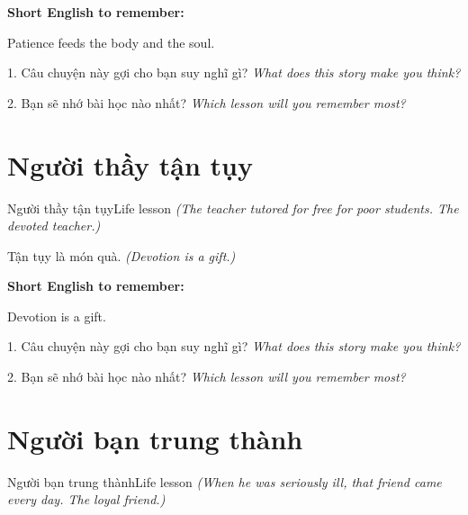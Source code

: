 \begin{ghinhoanh}
\textbf{Short English to remember:}

Patience feeds the body and the soul.

\end{ghinhoanh}

\begin{tuhocnhanh}
1. Câu chuyện này gợi cho bạn suy nghĩ gì? \textit{What does this story make you think?}

2. Bạn sẽ nhớ bài học nào nhất? \textit{Which lesson will you remember most?}
\end{tuhocnhanh}
\ngancach


\section{Người thầy tận tụy}
\begin{truyen}{Người thầy tận tụy}{Life lesson}
\textit{(The teacher tutored for free for poor students. The devoted teacher.)}
\end{truyen}

\begin{baihoc}
Tận tụy là món quà.
\textit{(Devotion is a gift.)}
\end{baihoc}

\begin{ghinhoanh}
\textbf{Short English to remember:}

Devotion is a gift.

\end{ghinhoanh}

\begin{tuhocnhanh}
1. Câu chuyện này gợi cho bạn suy nghĩ gì? \textit{What does this story make you think?}

2. Bạn sẽ nhớ bài học nào nhất? \textit{Which lesson will you remember most?}
\end{tuhocnhanh}
\ngancach


\section{Người bạn trung thành}
\begin{truyen}{Người bạn trung thành}{Life lesson}
\textit{(When he was seriously ill, that friend came every day. The loyal friend.)}
\end{truyen}

